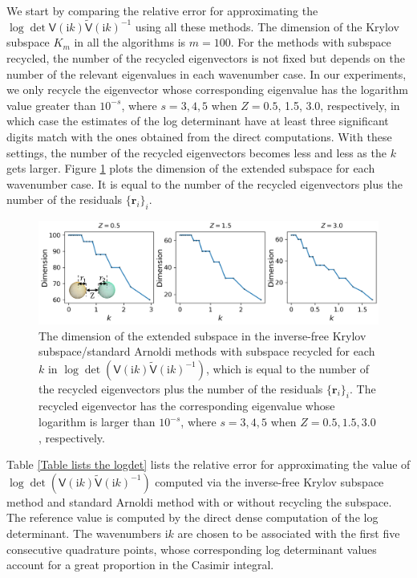 We start by comparing the relative error for approximating the $\log\det\mathsf{V}(\mathrm{i}k)\tilde{\mathsf{V}}(\mathrm{i}k)^{-1}$ using all these methods. 
The dimension of the Krylov subspace $K_m$ in all the algorithms is $m = 100$. 
For the methods with subspace recycled, the number of the recycled eigenvectors is not fixed but depends on the number of the relevant eigenvalues in each wavenumber case. 
In our experiments, we only recycle the eigenvector whose corresponding eigenvalue has the logarithm value greater than $10^{-s}$, where $s = 3, 4, 5$ when $Z = 0.5$, 1.5, 3.0, respectively, in which case the estimates of the log determinant have at least three significant digits match with the ones obtained from the direct computations. With these settings, the number of the recycled
eigenvectors becomes less and less as the $k$ gets larger.  Figure \ref{Dimension_of_the_extended_subspace} plots the dimension of the extended subspace
for each wavenumber case. It is equal to the number of the recycled eigenvectors plus the number of the residuals $\{\mathbf{r}_{i}\}_{i}$.


\begin{figure}[H]
    \centering
    \includegraphics[width = \textwidth]{figures/Dimension_of_the_extended_subspace.png}
    \caption{The dimension of the extended subspace in the inverse-free Krylov subspace/standard Arnoldi methods with subspace recycled for each $k$ in $\log\det(\mathsf{V}(\mathrm{i}k)\tilde{\mathsf{V}}(\mathrm{i}k)^{-1})$, which is equal to the number of the recycled 
    eigenvectors plus the number of the residuals $\{\mathbf{r}_{i}\}_{i}$. The recycled eigenvector has the corresponding eigenvalue whose logarithm
    is larger than $10^{-s}$, where $s = 3, 4, 5$ when $Z = 0.5, 1.5, 3.0$, respectively.}
    \label{Dimension_of_the_extended_subspace}
\end{figure}

Table \ref{Table lists the logdet} lists the relative error for approximating the value of $\log\det(\mathsf{V}(\mathrm{i}k)\tilde{\mathsf{V}}(\mathrm{i}k)^{-1})$ 
computed via the inverse-free Krylov subspace method and standard Arnoldi method with or without recycling the subspace. The reference value is computed by the 
direct dense computation of the log determinant. The wavenumbers $\mathrm{i}k$ are chosen to be associated with the first five consecutive quadrature points, 
whose corresponding log determinant values account for a great proportion in the Casimir integral. 

